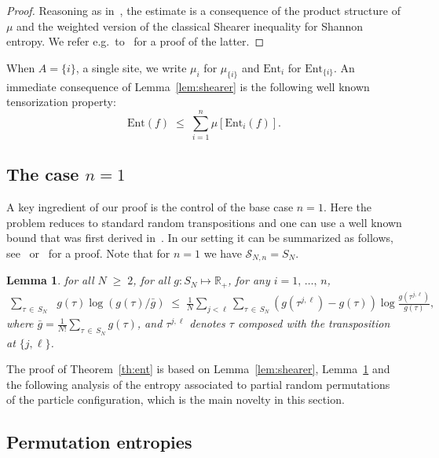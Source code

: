 \documentclass[10pt,a4paper]{amsart}
\renewcommand{\leq}{\;\leqslant\;}
\renewcommand{\geq}{\;\geqslant\;}
\newcommand{\ent}{\mathrm{Ent}}
\newcommand{\cS}{\mathcal{S}}
\newcommand{\bbR}{\mathbb{R}}
\let\t=\tau
\newtheorem{lemm}[theo]{Lemma}
\theoremstyle{definition}
\theoremstyle{plain}
\numberwithin{equation}{section}
\begin{document}
\begin{proof}
Reasoning as in~\cite[Proposition~4.3]{entprod}, the estimate is a consequence of the product structure of $\mu$ and the weighted version of the classical Shearer inequality for Shannon entropy. We refer e.g.\ to~\cite{Virag} for a proof of the latter.
\end{proof}

When $A=\{i\}$, a single site, we write $\mu_i$ for $\mu_{\{i\}}$ and $\ent_i$ for $\ent_{\{i\}}$. An immediate consequence of Lemma~\ref{lem:shearer} is the following well known tensorization property:
\begin{equation}\label{tensor}
\ent(f) \leq\sum_{i=1}^n \mu\left[\ent_{i}(f) \right].
\end{equation}



\subsection{The case \texorpdfstring{$n=1$}{n=1}}

A key ingredient of our proof is the control of the base case $n=1$. Here the problem reduces to standard random transpositions and one can use a well known bound that was first derived in~\cite{Goel,GQ}. In our setting it can be summarized as follows, see~\cite[Theorem~1]{GQ} or~\cite[Corollary~3.1]{Goel} for a proof. Note that for $n=1$ we have $\cS_{N,n} =S_N$.

\begin{lemm}
\label{GQlemma} for all $N\geq 2$, for all $g:S_N\mapsto\bbR_+$, for any $i=1,\,\dots,\,n$,
\begin{align*}
\sum_{\t\,\in\,S_N} &g(\t)\log(g(\t)/\bar g)
\leq \frac1N\sum_{j<\ell}
\sum_{\t\,\in\,S_N}
\left(g(\t^{j,\ell}) - g(\t)\right)\log \frac{g(\t^{j,\ell})}{g(\t)},
\end{align*}
where $\bar g = \frac1{N!}\sum_{\t\,\in\,S_N}g(\t)$, and $\t^{j,\ell}$ denotes $\t$ composed with the transposition at $\{j,\ell\}$.
\end{lemm}

The proof of Theorem~\ref{th:ent} is based on Lemma~\ref{lem:shearer}, Lemma~\ref{GQlemma} and the following analysis of the entropy associated to partial random permutations of the particle configuration, which is the main novelty in this section.

\subsection{Permutation entropies}
\end{document}
